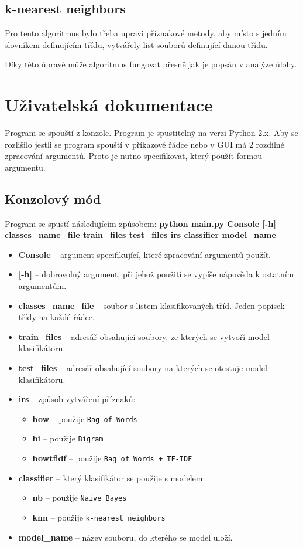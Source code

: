 \documentclass[12pt]{article}
\begin{document}
\subsection{k-nearest neighbors}
Pro tento algoritmus bylo třeba upravi příznakové metody, 
aby místo s jedním slovníkem definujícím třídu, vytvářely
list souborů definující danou třídu.

Díky této úpravě může algoritmus fungovat přesně jak je 
popsán v analýze úlohy.
%
%
\section{Uživatelská dokumentace}
Program se spouští z konzole. Program je spustitelný na verzi Python
2.x. Aby se rozlišilo jestli se program spouští v příkazové řádce
nebo v GUI má 2 rozdílné zpracování argumentů. Proto je nutno 
specifikovat, který použít formou argumentu.
\subsection{Konzolový mód}
Program se spustí následujícím způsobem: 
\textbf{python main.py Console [-h] classes\_name\_file train\_files test\_files irs classifier model\_name}
\begin{itemize}
	\item \textbf{Console} -- argument specifikující, které zpracování argumentů
		použít.
	\item \textbf{[-h]} -- dobrovolný argument, při jehož použití se vypíše
		nápověda k ostatním argumentům.
	\item \textbf{classes\_name\_file} -- soubor s listem klasifikovaných tříd.
		Jeden popisek třídy na každé řádce.
	\item \textbf{train\_files} -- adresář obsahující soubory, ze kterých se 
		vytvoří model klasifikátoru.
	\item \textbf{test\_files} -- adresář obsahující soubory na kterých
		se otestuje model klasifikátoru.
	\item \textbf{irs} -- způsob vytváření příznaků:
		\begin{itemize}
			\item \textbf{bow} -- použije \texttt{Bag of Words}
			\item \textbf{bi} -- použije \texttt{Bigram}
			\item \textbf{bowtfidf} -- použije \texttt{Bag of Words
				+ TF-IDF}
		\end{itemize}
	\item \textbf{classifier} -- který klasifikátor se použije s modelem:
		\begin{itemize}
			\item \textbf{nb} -- použije \texttt{Naive Bayes}
			\item \textbf{knn} -- použije \texttt{k-nearest neighbors}
		\end{itemize}
	\item \textbf{model\_name} -- název souboru, do kterého se model uloží.
\end{itemize}
\end{document}
